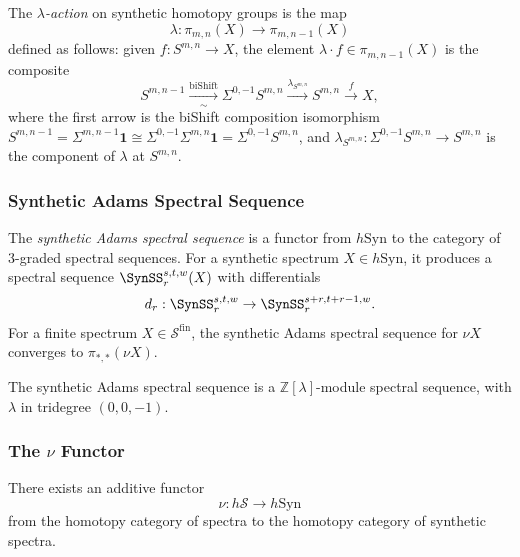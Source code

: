 \begin{definition}\label{prereq:def:lambda-action}
    \leanok
    The \emph{$\lambda$-action} on synthetic homotopy groups is the map
    $$\lambda: \pi_{m,n}(X) \to \pi_{m,n-1}(X)$$
    defined as follows: given $f: S^{m,n} \to X$, the element $\lambda \cdot f \in \pi_{m,n-1}(X)$ is the composite
    $$S^{m,n-1} \xrightarrow[\sim]{\mathrm{biShift}} \Sigma^{0,-1}S^{m,n} \xrightarrow{\lambda_{S^{m,n}}} S^{m,n} \xrightarrow{f} X,$$
    where the first arrow is the biShift composition isomorphism $S^{m,n-1} = \Sigma^{m,n-1}\mathbf{1} \cong \Sigma^{0,-1}\Sigma^{m,n}\mathbf{1} = \Sigma^{0,-1}S^{m,n}$, and $\lambda_{S^{m,n}}: \Sigma^{0,-1}S^{m,n} \to S^{m,n}$ is the component of $\lambda$ at $S^{m,n}$.
\end{definition}

\subsubsection{Synthetic Adams Spectral Sequence}\label{sec:prereq-syn-adams}

\begin{axiom}\label{prereq:ax:syn-adams-ss}
    \leanok
    The \emph{synthetic Adams spectral sequence} is a functor from $h\mathrm{Syn}$ to the category of 3-graded spectral sequences. For a synthetic spectrum $X \in h\mathrm{Syn}$, it produces a spectral sequence $\SynSS_r^{s,t,w}(X)$ with differentials
    $$d_r: \SynSS_r^{s,t,w} \to \SynSS_r^{s+r, t+r-1, w}.$$
    For a finite spectrum $X \in \mathcal{S}^{\mathrm{fin}}$, the synthetic Adams spectral sequence for $\nu X$ converges to $\pi_{*,*}(\nu X)$.
\end{axiom}

\begin{remark}
    The synthetic Adams spectral sequence is a $\mathbb{Z}[\lambda]$-module spectral sequence, with $\lambda$ in tridegree $(0,0,-1)$.
\end{remark}

\subsubsection{The $\nu$ Functor}\label{sec:prereq-nu}

\begin{axiom}\label{prereq:ax:nu-functor}
    \leanok
    There exists an additive functor
    $$\nu: h\mathcal{S} \to h\mathrm{Syn}$$
    from the homotopy category of spectra to the homotopy category of synthetic spectra.
\end{axiom}


